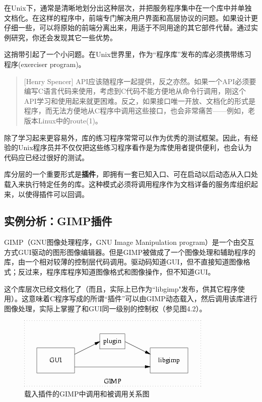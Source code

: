 \documentclass[12pt,oneside]{book}
\begin{document}
在Unix下，通常是清晰地划分出这种层次，并把服务程序集中在一个库中并单独文档化。在这样的程序中，前端专门解决用户界面和高层协议的问题。如果设计更仔细一些，可以将原始的前端分离出来，用适于不同用途的其它部件代替。通过实例研究，你还会发现其它一些优势。

这捎带引起了一个小问题。在Unix世界里，作为“程序库”发布的库必须携带练习程序(exerciser program)。

\begin{quote}[Henry Spencer]
API应该随程序一起提供，反之亦然。如果一个API必须要编写C语言代码来使用，考虑到C代码不能方便地从命令行调用，刚这个API学习和使用起来就更困难。反之，如果接口唯一开放、文档化的形式是程序，而无法方便地从C程序中调用这些接口，也会非常痛苦——例如，老版本Linux中的route(1)。
\end{quote}

除了学习起来更容易外，库的练习程序常常可以作为优秀的测试框架。因此，有经验的Unix程序员并不仅仅把这些练习程序看作是为库使用者提供便利，也会认为代码应已经过很好的测试。

库分层的一个重要形式是\textbf{插件}，即拥有一套已知入口、可在启动以后动态从入口处载入来执行特定任务的库。这种模式必须将调用程序作为文档详备的服务库组织起来，以使得插件可以回调。


\subsection{实例分析：GIMP插件}
GIMP（GNU图像处理程序，GNU Image Manipulation program）是一个由交互方式GUI驱动的图形图像编辑器。但是GIMP被做成了一个图像处理和辅助程序的库，由一个相对较薄的控制层代码调用。驱动码知道GUI，但不直接知道图像格式；反过来，程序库程序知道图像格式和图像操作，但不知道GUI。

这个库层次已经文档化了（而且，实际上已作为“libgimp"发布，供其它程序使用）。这意味着C程序写成的所谓“插件”可以由GIMP动态载入，然后调用该库进行图像处理，实际上掌握了和GUI同一级别的控制权（参见图4.2）。


\begin{figure}[H]
\centering
\includegraphics[scale=1 , keepaspectratio]{GIMP-diao-yong.png}
\caption{载入插件的GIMP中调用和被调用关系图}
\end{figure}
\end{document}

